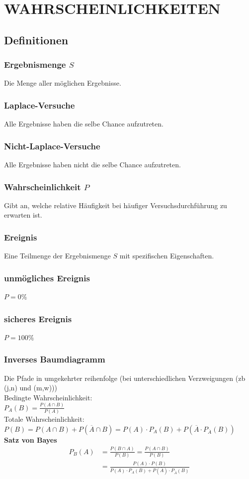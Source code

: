 \documentclass[a4paper,12pt]{article}
\begin{document}
\section{WAHRSCHEINLICHKEITEN}
\subsection{Definitionen}
\subsubsection{Ergebnismenge $S$}
Die Menge aller möglichen Ergebnisse.
\subsubsection{Laplace-Versuche}
Alle Ergebnisse haben die selbe Chance aufzutreten.
\subsubsection{Nicht-Laplace-Versuche}
Alle Ergebnisse haben nicht die selbe Chance aufzutreten.
\subsubsection{Wahrscheinlichkeit $P$}
Gibt an, welche relative Häufigkeit bei häufiger Versuchsdurchführung zu erwarten ist.
\subsubsection{Ereignis}
Eine Teilmenge der Ergebnismenge $S$ mit spezifischen Eigenschaften.
\subsubsection{unmögliches Ereignis}
$P = 0 \%$ 
\subsubsection{sicheres Ereignis}
$P = 100 \%$ 
\pagebreak
\subsubsection{Inverses Baumdiagramm}
Die Pfade in umgekehrter reihenfolge (bei unterschiedlichen Verzweigungen (zb (j,n) und (m,w)))\\
Bedingte Wahrscheinlichkeit:\\
$P_A(B) = \frac{P(A \cap B)}{P(A)}$\\
Totale Wahrscheinlichkeit:\\
$P(B) = P(A \cap B) + P(\overline{A} \cap B) = P(A) \cdot P_A(B) + P(\overline{A} \cdot P_{\overline{A}}(B))$\\
\textbf{Satz von Bayes}\\
\begin{equation*}
\begin{split}
P_B(A) & = \frac{P(B \cap A)}{P(B)} = \frac{P(A \cap B)}{P(B)}\\
\ \ \ \ \ & = \frac{P(A) \cdot P(B)}{P(A) \cdot P_A(B) + P(\overline{A}) \cdot P_{\overline{A}}(B)}
\end{split}
\end{equation*}
\end{document}
